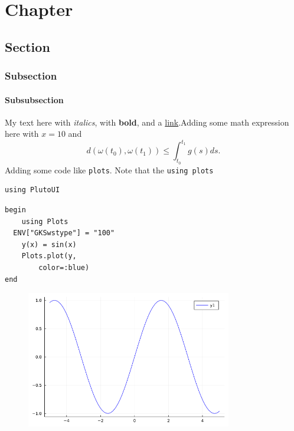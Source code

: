 \newpage

\chapter{Chapter}

\section{Section}

\subsection{Subsection}

\subsubsection{Subsubsection}
My text here with \textit{italics}, with \textbf{bold}, and a  \href{https://davibarreira.github.io/}{link}.Adding some math expression here with $x=10$ and
\begin{displaymath}
	d(\omega(t_0),\omega(t_1)) \leq \int^{t_1}_{t_0}g(s) ds.
\end{displaymath}
Adding some code like \lstinline[style=julia]{plots}. Note that the \lstinline[style=julia]{using plots}
\begin{lstlisting}[language=JuliaLocal, style=julia]
using PlutoUI
\end{lstlisting}

\begin{lstlisting}[language=JuliaLocal, style=julia]
begin
	using Plots
  ENV["GKSwstype"] = "100"
	y(x) = sin(x)
	Plots.plot(y,
		color=:blue)
end
\end{lstlisting}

\begin{figure}[H]
	\centering
	\includegraphics[width=0.8\textwidth]{./figures/notebooktest_figure1.png}
	\label{fig:notebooktest_figure1.png}

\end{figure}

